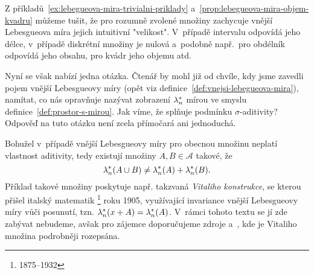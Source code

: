Z příkladů~\ref{ex:lebegueova-mira-trivialni-priklady} a~\ref{prop:lebegueova-mira-objem-kvadru} můžeme tušit, že pro rozumně zvolené množiny zachycuje vnější Lebesgueova míra jejich intuitivní "velikost". V~případě intervalu odpovídá jeho délce, v~případě diskrétní množiny je nulová a~podobně např.~pro obdélník odpovídá jeho obsahu, pro kvádr jeho objemu atd.

Nyní se však nabízí jedna otázka. Čtenář by mohl již od chvíle, kdy jsme zavedli pojem vnější Lebesgueovy míry (opět viz definice~\ref{def:vnejsi-lebegueova-mira}), namítat, co nás opravňuje nazývat zobrazení $\lambda_n^*$ mírou ve smyslu definice~\ref{def:prostor-s-mirou}. Jak víme, že splňuje podmínku $\sigma$-aditivity? Odpověď na tuto otázku není zcela přímočará ani jednoduchá.

Bohužel v~případě vnější Lebesgueovy míry pro obecnou množinu neplatí vlastnost aditivity, tedy existují množiny $A,B\in\mathcal{A}$ takové, že
\[\lambda_n^*(A\cup B)\neq\lambda_n^*(A)+\lambda_n^*(B).\]
Příklad takové množiny poskytuje např. takzvaná \emph{Vitaliho konstrukce}, se kterou přišel italský matematik \footnote{1875--1932} roku 1905, využívající invariance vnější Lebesgueovy míry vůči posunutí, tzn. $\lambda_n^*(x+A)=\lambda_n^*(A)$. \cite{OConnor2025} V~rámci tohoto textu se jí zde zabývat nebudeme, avšak pro zájemce doporučujeme zdroje \citep[str. 3]{Lukes2013} a~\cite{Verner2025}, kde je Vitaliho množina podrobněji rozepsána.


